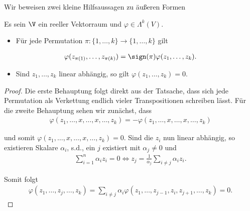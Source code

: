 \par
Wir beweisen zwei kleine Hilfsaussagen zu äußeren Formen
\label{vektoranalysis/multilinear:lemma-15}
\begin{lemma}{}{}



\par
Es sein \(\V\) ein reeller Vektorraum und \(\varphi\in\Lambda^k(V)\).
\begin{itemize}
\item {} 
\par
Für jede Permutation \(\pi:\{1,\ldots,k\}\rightarrow\{1,\ldots,k\}\) gilt

\end{itemize}
\begin{align*}
\varphi(z_{\pi(1)},\ldots,z_{\pi(k)}) = \sign(\pi) \varphi(z_1,\ldots,z_k).
\end{align*}\begin{itemize}
\item {} 
\par
Sind \(z_1,\ldots, z_k\) linear abhängig, so gilt \(\varphi(z_1,\ldots,z_k) = 0\).

\end{itemize}
\end{lemma}

\begin{proof}
 Die erste Behauptung folgt direkt aus der Tatsache, dass sich jede Permutation als Verkettung endlich vieler Transpositionen schreiben lässt.
Für die zweite Behauptung sehen wir zunächst, dass
\begin{align*}
\varphi(z_1,\ldots,x,\ldots, x,\ldots,z_k) = -\varphi(z_1,\ldots,x,\ldots,x,\ldots,z_k)
\end{align*}
\par
und somit \(\varphi(z_1,\ldots,x,\ldots,x,\ldots,z_k)=0\). Sind die \(z_i\) nun linear abhängig, so existieren Skalare \(\alpha_i\), s.d.,
ein \(j\) existiert mit \(\alpha_j\neq 0\) und
\begin{align*}
\sum_{i=1}^n \alpha_i z_i = 0 \Leftrightarrow z_j = 
\frac{1}{\alpha_j} \sum_{i\neq j} \alpha_i z_i.
\end{align*}
\par
Somit folgt
\begin{align*}
\varphi(z_1,\ldots,z_j,\ldots,z_k) = 
\sum_{i\neq j} \alpha_i \varphi(z_1,\ldots,z_{j-1},z_i,z_{j+1},\ldots,z_k) = 0.
\end{align*}\end{proof}

